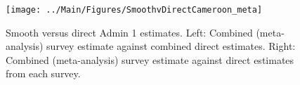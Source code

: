 \documentclass[12pt]{article}\usepackage[]{graphicx}\usepackage[]{color}
\newenvironment{knitrout}{}{} %
\begin{document}



\begin{knitrout}
\color{fgcolor}\begin{figure}[bht]

{\centering \texttt{[image: ../Main/Figures/SmoothvDirectCameroon\_meta]} 

}

\caption[Smooth versus direct Admin 1 estimates]{Smooth versus direct Admin 1 estimates. Left: Combined (meta-analysis) survey estimate against combined direct estimates. Right: Combined (meta-analysis) survey estimate against direct estimates from each survey.}\label{fig:unnamed-chunk-43}
\end{figure}


\end{knitrout}
\end{document}
